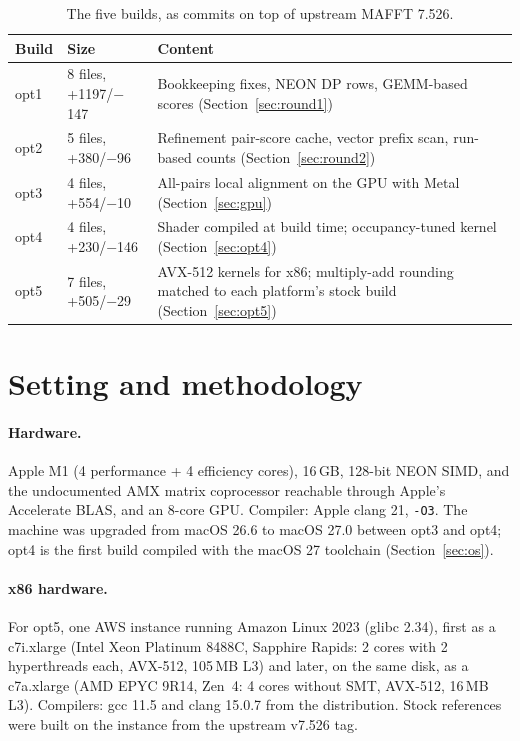 \documentclass[11pt]{article}
\newcommand{\code}[1]{\texttt{#1}}
\begin{document}
\begin{table}[h]
\centering
\caption{The five builds, as commits on top of upstream MAFFT 7.526.}
\label{tab:builds}
\begin{tabularx}{\linewidth}{llX}
\toprule
Build & Size & Content \\
\midrule
opt1 & 8 files, +1197/$-$147 & Bookkeeping fixes, NEON DP rows, GEMM-based scores (Section~\ref{sec:round1}) \\
opt2 & 5 files, +380/$-$96 & Refinement pair-score cache, vector prefix scan, run-based counts (Section~\ref{sec:round2}) \\
opt3 & 4 files, +554/$-$10 & All-pairs local alignment on the GPU with Metal (Section~\ref{sec:gpu}) \\
opt4 & 4 files, +230/$-$146 & Shader compiled at build time; occupancy-tuned kernel (Section~\ref{sec:opt4}) \\
opt5 & 7 files, +505/$-$29 & AVX-512 kernels for x86; multiply-add rounding matched to each platform's stock build (Section~\ref{sec:opt5}) \\
\bottomrule
\end{tabularx}
\end{table}

\section{Setting and methodology}

\paragraph{Hardware.} Apple M1 (4 performance + 4 efficiency cores), 16\,GB, 128-bit NEON
SIMD, and the undocumented AMX matrix coprocessor reachable through Apple's Accelerate
BLAS, and an 8-core GPU. Compiler: Apple clang 21, \code{-O3}. The machine was upgraded
from macOS 26.6 to macOS 27.0 between opt3 and opt4; opt4 is the first build compiled with
the macOS 27 toolchain (Section~\ref{sec:os}).

\paragraph{x86 hardware.} For opt5, one AWS instance running Amazon Linux 2023 (glibc 2.34),
first as a c7i.xlarge (Intel Xeon Platinum 8488C, Sapphire Rapids: 2 cores with 2 hyperthreads
each, AVX-512, 105\,MB L3) and later, on the same disk, as a c7a.xlarge (AMD EPYC 9R14,
Zen~4: 4 cores without SMT, AVX-512, 16\,MB L3). Compilers: gcc 11.5 and clang 15.0.7 from the
distribution. Stock references were built on the instance from the upstream v7.526 tag.
\end{document}
